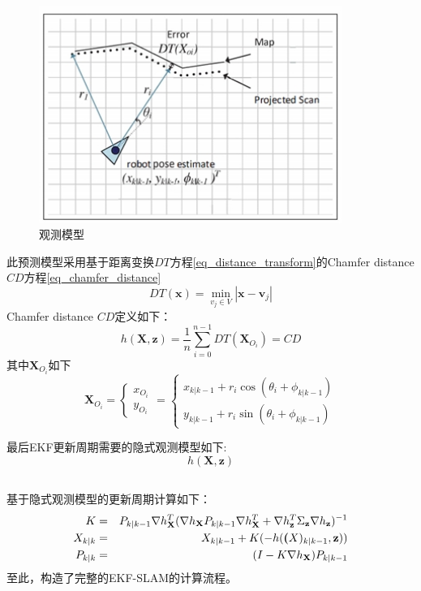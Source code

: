 \documentclass[12pt,a4paper]{article}
\newcommand{\zhiv}{\fontsize{12pt}{18pt}\selectfont}      %
\begin{document}
\begin{figure}[!htb]
  \centering
  \includegraphics[height=200pt]{observation_model.jpg}
  \caption{观测模型\label{f_observation_model}\label{f_prediction_model}}
\end{figure}
此预测模型采用基于距离变换$DT$方程\ref{eq_distance_transform}的Chamfer distance $CD$方程\ref{eq_chamfer_distance}
\begin{equation}
    DT(\textbf{x}) = \min_{v_j\in V}|\textbf{x}-\textbf{v}_j|
    \label{eq_distance_transform}
\end{equation}
Chamfer distance $CD$定义如下：
\begin{equation}
h(\textbf{X},\textbf{z}) = \frac{1}{n}\sum_{i=0}^{n-1}DT(\textbf{X}_{O_i})=CD
\label{eq_chamfer_distance}
\end{equation}
其中$\textbf{X}_{O_i}$如下
\begin{equation}
    \textbf{X}_{O_i}=\begin{cases} x_{O_i} \\ y_{O_i} \end{cases} =
    \begin{cases}
    x_{k|k-1}+r_i\cos(\theta_i+\phi_{k|k-1})\\
    y_{k|k-1}+r_i\sin(\theta_i+\phi_{k|k-1})
    \end{cases}
    \label{eq_cd_x_o}
\end{equation}

最后EKF更新周期需要的隐式观测模型如下:
\begin{equation}
    h(\textbf{X},\textbf{z})
    \label{eq_implicit_observation}
\end{equation}

{\subsection{\textbf{\song\zhiv{更新}}}}
基于隐式观测模型的更新周期计算如下：
\begin{eqnarray}
K &=& P_{k|k-1} \nabla h_\textbf{X}^T (\nabla h_\textbf{X} P_{k|k-1}\nabla h_\textbf{X}^T+\nabla h_\textbf{z}^T \Sigma_\textbf{z} \nabla h_\textbf{z} )^{-1}\\
X_{k|k} &=& X_{k|k-1}+K(-h(\textbf(X)_{k|k-1},\textbf{z})) \\
P_{k|k} &=& (I-K\nabla h_\textbf{X})P_{k|k-1}
\end{eqnarray}
至此，构造了完整的EKF-SLAM的计算流程。
\end{document}
